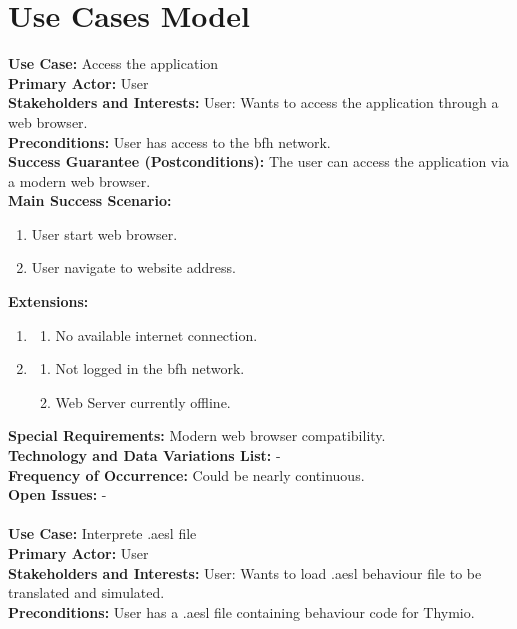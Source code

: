 \documentclass{scrbook}
\begin{document}
\section{Use Cases Model}

\textbf{Use Case: }Access the application \\
\textbf{Primary Actor: }User \\
\textbf{Stakeholders and Interests: }User: Wants to access the application through a web browser. \\
\textbf{Preconditions: }User has access to the bfh network. \\
\textbf{Success Guarantee (Postconditions): }The user can access the application via a modern web browser. \\
\textbf{Main Success Scenario: } 
\begin{enumerate}
  \item User start web browser.
  \item User navigate to website address.
\end{enumerate}
\textbf{Extensions: } 
\begin{enumerate}
  \item 
  \begin{enumerate}
    \item No available internet connection.
  \end{enumerate}
  \item 
  \begin{enumerate}
    \item Not logged in the bfh network.
    \item Web Server currently offline.
  \end{enumerate}
\end{enumerate}
\textbf{Special Requirements: }Modern web browser compatibility. \\
\textbf{Technology and Data Variations List: }- \\
\textbf{Frequency of Occurrence: }Could be nearly continuous.\\
\textbf{Open Issues: }- \\
\\
\textbf{Use Case: }Interprete .aesl file \\
\textbf{Primary Actor: }User \\
\textbf{Stakeholders and Interests: }User: Wants to load .aesl behaviour file to be translated and simulated. \\
\textbf{Preconditions: }User has a .aesl file containing behaviour code for Thymio. \\
\end{document}
